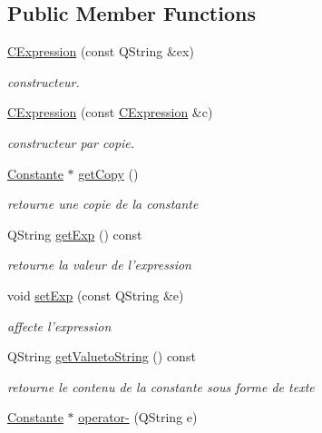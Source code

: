 \subsection*{Public Member Functions}
\begin{DoxyCompactItemize}
\item 
\hyperlink{class_c_expression_abe2a95c195c0f029e043713e6b2bd9b4}{C\-Expression} (const Q\-String \&ex)
\begin{DoxyCompactList}\small\item\em constructeur. \end{DoxyCompactList}\item 
\hyperlink{class_c_expression_aaf547abee194320f2c2edcb537f35bb3}{C\-Expression} (const \hyperlink{class_c_expression}{C\-Expression} \&c)
\begin{DoxyCompactList}\small\item\em constructeur par copie. \end{DoxyCompactList}\item 
\hyperlink{class_constante}{Constante} $\ast$ \hyperlink{class_c_expression_a0fbadaea165e135c3e12bc35b31a2d55}{get\-Copy} ()
\begin{DoxyCompactList}\small\item\em retourne une copie de la constante \end{DoxyCompactList}\item 
Q\-String \hyperlink{class_c_expression_a54a798d90fe842c6e95f2c85fc73e0f6}{get\-Exp} () const 
\begin{DoxyCompactList}\small\item\em retourne la valeur de l'expression \end{DoxyCompactList}\item 
void \hyperlink{class_c_expression_adcac8fc467b9eeedcba5f5eab4e390b6}{set\-Exp} (const Q\-String \&e)
\begin{DoxyCompactList}\small\item\em affecte l'expression \end{DoxyCompactList}\item 
Q\-String \hyperlink{class_c_expression_a642f89de974553f82cff731f6d83fea6}{get\-Valueto\-String} () const 
\begin{DoxyCompactList}\small\item\em retourne le contenu de la constante sous forme de texte \end{DoxyCompactList}\item 
\hyperlink{class_constante}{Constante} $\ast$ \hyperlink{class_c_expression_acd13043bccbe2e9d63604ecc9b1b2917}{operator-\/} (Q\-String e)

\end{DoxyCompactItemize}
